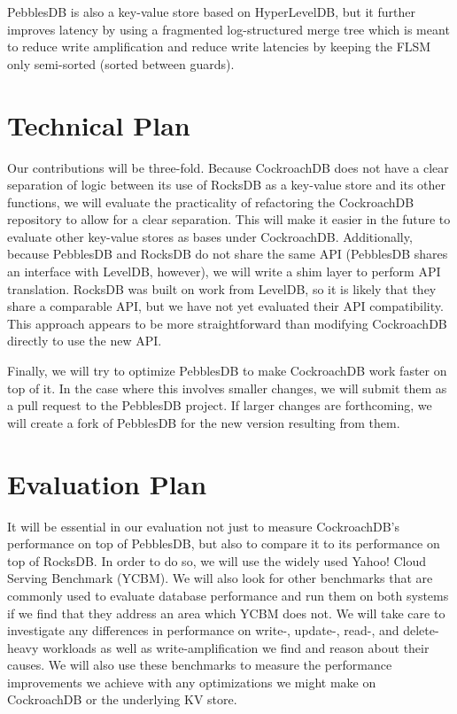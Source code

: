\documentclass[10pt,twocolumn,letterpaper]{article}
\begin{document}
PebblesDB is also a key-value store based on HyperLevelDB, but it further
improves latency by using a fragmented log-structured merge tree which is meant
to reduce write amplification and reduce write latencies by keeping the FLSM
only semi-sorted (sorted between guards).


\section{Technical Plan}
Our contributions will be three-fold. Because CockroachDB does not have a clear
separation of logic between its use of RocksDB as a key-value store and its
other functions, we will evaluate the practicality of refactoring the
CockroachDB repository to allow for a clear separation. This will make it
easier in the future to evaluate other key-value stores as bases under
CockroachDB. Additionally, because PebblesDB and RocksDB do not share the same
API (PebblesDB shares an interface with LevelDB, however), we will write a shim
layer to perform API translation. RocksDB was built on work from LevelDB, so it
is likely that they share a comparable API, but we have not yet evaluated their
API compatibility. This approach appears to be more straightforward than
modifying CockroachDB directly to use the new API.

Finally, we will try to optimize PebblesDB to make CockroachDB work faster on
top of it. In the case where this involves smaller changes, we will submit them
as a pull request to the PebblesDB project. If larger changes are forthcoming,
we will create a fork of PebblesDB for the new version resulting from them.


\section{Evaluation Plan}
It will be essential in our evaluation not just to measure CockroachDB's
performance on top of PebblesDB, but also to compare it to its performance on
top of RocksDB. In order to do so, we will use the widely used Yahoo! Cloud
Serving Benchmark (YCBM). We will also look for other benchmarks that are
commonly used to evaluate database performance and run them on both systems if
we find that they address an area which YCBM does not. We will take care to
investigate any differences in performance on write-, update-, read-, and
delete-heavy workloads as well as write-amplification we find and reason about
their causes. We will also use these benchmarks to measure the performance
improvements we achieve with any optimizations we might make on CockroachDB or
the underlying KV store.
\end{document}
